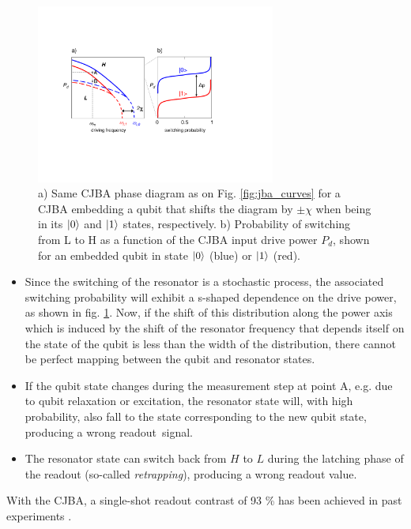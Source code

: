 \begin{figure}
	\includegraphics[width=0.7\textwidth]{./material/figures/2-qubit-processor/readout_principle}
	\caption[]{a) Same CJBA phase diagram as on Fig. \ref{fig:jba_curves} for a CJBA embedding a qubit that shifts the diagram by $\pm\chi$ when being in its $\left| 0 \right>$ and $\left| 1 \right>$ states, respectively. b) Probability of switching from L to H as a function of the CJBA input drive power $P_d$, shown for an embedded qubit in state $\left| 0 \right>$ (blue) or $\left| 1 \right>$ (red).}
	\label{fig:readout_process_illustration}
\end{figure}

\begin{itemize}
\item Since the switching of the resonator is a stochastic process, the associated switching probability will exhibit a s-shaped dependence on the drive power, as shown in fig. \ref{fig:readout_process_illustration}. Now, if the shift of this distribution along the power axis which is induced by the shift of the resonator frequency that depends itself on the state of the qubit is less than the width of the distribution, there cannot be perfect mapping between the qubit and resonator states.
\item If the qubit state changes during the measurement step at point A, e.g. due to qubit relaxation or excitation, the resonator state will, with high probability, also fall to the state corresponding to the new qubit state, producing a wrong \mbox{readout signal}.
\item The resonator state can switch back from $H$ to $L$ during the latching phase of the readout (so-called {\it retrapping}), producing a wrong readout value.
\end{itemize}

With the CJBA, a single-shot readout contrast of 93 \% has been achieved in past experiments \citep{mallet_single-shot_2009}.

